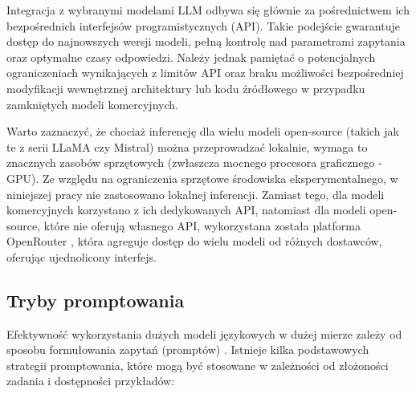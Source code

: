 Integracja z wybranymi modelami LLM odbywa się głównie za pośrednictwem ich bezpośrednich interfejsów programistycznych (API). Takie podejście gwarantuje dostęp do najnowszych wersji modeli, pełną kontrolę nad parametrami zapytania oraz optymalne czasy odpowiedzi. Należy jednak pamiętać o potencjalnych ograniczeniach wynikających z limitów API oraz braku możliwości bezpośredniej modyfikacji wewnętrznej architektury lub kodu źródłowego w przypadku zamkniętych modeli komercyjnych.

Warto zaznaczyć, że chociaż inferencję dla wielu modeli open-source (takich jak te z serii LLaMA czy Mistral) można przeprowadzać lokalnie, wymaga to znacznych zasobów sprzętowych (zwłaszcza mocnego procesora graficznego - GPU). Ze względu na ograniczenia sprzętowe środowiska eksperymentalnego, w niniejszej pracy nie zastosowano lokalnej inferencji. Zamiast tego, dla modeli komercyjnych korzystano z ich dedykowanych API, natomiast dla modeli open-source, które nie oferują własnego API, wykorzystana została platforma OpenRouter \cite{openrouter}, która agreguje dostęp do wielu modeli od różnych dostawców, oferując ujednolicony interfejs.

\subsection{Tryby promptowania}

Efektywność wykorzystania dużych modeli językowych w dużej mierze zależy od sposobu formułowania zapytań (promptów) \cite{kratzke_dont_2024}. Istnieje kilka podstawowych strategii promptowania, które mogą być stosowane w zależności od złożoności zadania i dostępności przykładów:

